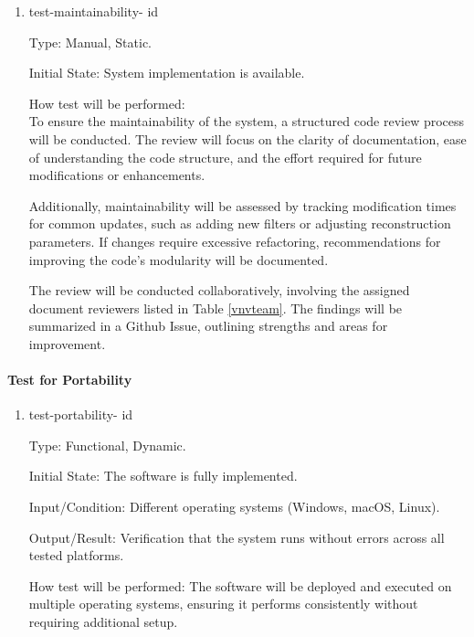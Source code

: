 \documentclass[12pt, titlepage]{article}
\newcounter{testnum}
\newcommand{\dthetestnum}{id\thetestnum}
\begin{document}
\begin{enumerate}

\item{test-maintainability- \label{id9} \dthetestnum\\}

Type: Manual, Static.

Initial State: System implementation is available.

How test will be performed:\\
To ensure the maintainability of the system, a structured code review process
will be conducted. The review will focus on the clarity of documentation, ease of
understanding the code structure, and the effort required for future
modifications or enhancements.

Additionally, maintainability will be assessed by tracking modification times
for common updates, such as adding new filters or adjusting reconstruction
parameters. If changes require excessive refactoring, recommendations for
improving the code's modularity will be documented.

The review will be conducted collaboratively, involving the assigned document
reviewers listed in Table \ref{vnvteam}. The findings will be summarized in a
Github Issue, outlining strengths and areas for improvement.
\end{enumerate}

\paragraph{Test for Portability}

\begin{enumerate}

\item{test-portability- \label{id10} \dthetestnum\\}

Type: Functional, Dynamic.

Initial State: The software is fully implemented.

Input/Condition: Different operating systems (Windows, macOS, Linux).

Output/Result: Verification that the system runs without errors across all tested platforms.

How test will be performed: The software will be deployed and executed on
multiple operating systems, ensuring it performs consistently without requiring
additional setup.
\end{enumerate}
\end{document}
